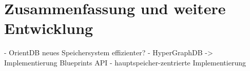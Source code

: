 \chapter{Zusammenfassung und weitere Entwicklung}
\label{cha:Fazit}

- OrientDB neues Speichersystem effizienter?
- HyperGraphDB -> Implementierung Blueprints API
- hauptspeicher-zentrierte Implementierung